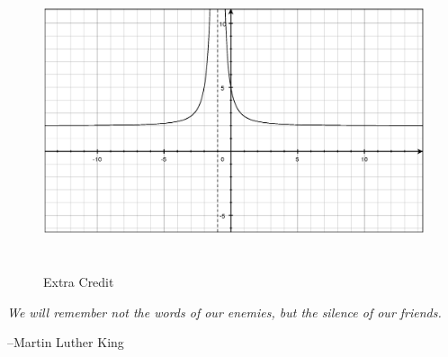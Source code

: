 \documentclass[fleqn,addpoints]{exam}
\begin{document}
\begin{questions}
\begin{figure}[H]
  \centering
  \includegraphics[width=12.25cm,height=8.75cm]{extra_credit.eps}
  \caption*{Extra Credit}
\end{figure}

\end{questions}

\ifprintanswers
\else
\vspace{1 cm}

{\em We will remember not the words of our enemies, but the silence of our friends.}

\vspace{.1 cm}
\hspace{1 cm} --Martin Luther King

\fi
\end{document}
